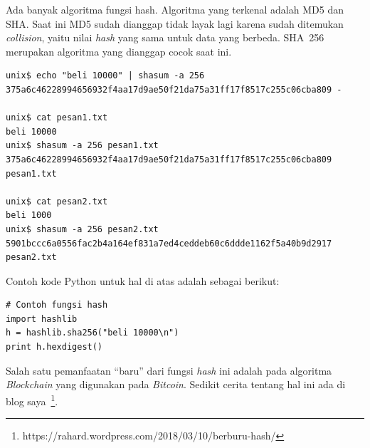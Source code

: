 Ada banyak algoritma fungsi hash. Algoritma yang terkenal adalah MD5
dan SHA. Saat ini MD5 sudah dianggap tidak layak lagi karena sudah
ditemukan {\em collision}, yaitu nilai {\em hash} yang sama untuk data
yang berbeda. SHA~256 merupakan algoritma yang dianggap cocok saat ini.

\begin{verbatim}
unix$ echo "beli 10000" | shasum -a 256
375a6c46228994656932f4aa17d9ae50f21da75a31ff17f8517c255c06cba809 -

unix$ cat pesan1.txt
beli 10000
unix$ shasum -a 256 pesan1.txt
375a6c46228994656932f4aa17d9ae50f21da75a31ff17f8517c255c06cba809 pesan1.txt

unix$ cat pesan2.txt
beli 1000
unix$ shasum -a 256 pesan2.txt
5901bccc6a0556fac2b4a164ef831a7ed4ceddeb60c6ddde1162f5a40b9d2917 pesan2.txt
\end{verbatim}

Contoh kode Python untuk hal di atas adalah sebagai berikut:

\begin{verbatim}
# Contoh fungsi hash
import hashlib
h = hashlib.sha256("beli 10000\n")
print h.hexdigest()
\end{verbatim}


Salah satu pemanfaatan ``baru'' dari fungsi {\em hash} ini adalah pada
algoritma {\em Blockchain} yang digunakan pada {\em Bitcoin}. Sedikit
cerita tentang hal ini ada di blog
saya~\footnote{https://rahard.wordpress.com/2018/03/10/berburu-hash/}.

